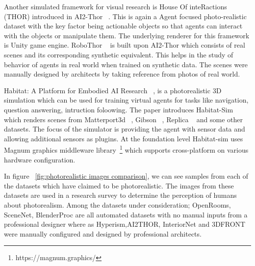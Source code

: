 Another simulated framework for visual research is House Of inteRactions (THOR) introduced in AI2-Thor ~\cite{kolve2019ai2thor}.
This is again a Agent focused photo-realistic dataset with the key factor being actionable objects so that agents can interact with the objects or manipulate them.
The underlying renderer for this framework is Unity game engine.
RoboThor ~\cite{Deitke2020RoboTHORAO} is built upon AI2-Thor which consists of real scenes and its corresponding synthetic equivalent.
This helps in the study of behavior of agents in real world when trained on synthetic data.
The scenes were manually designed by architects by taking reference from photos of real world.

Habitat: A Platform for Embodied AI Research ~\cite{savva2019habitat}, is a photorealistic 3D simulation which can be used for training virtual agents for tasks like navigation, question answering, intruction foloowing.
The paper introduces Habitat-Sim which renders scenes from Matterport3d ~\cite{chang2017matterport3d}, Gibson ~\cite{xia2018gibson}, Replica ~\cite{Straub2019TheRD} and some other datasets.
The focus of the simulator is providing the agent with sensor data and allowing additional sensors as plugins.
At the foundation level Habitat-sim uses Magnum graphics
middleware library~\footnote{https://magnum.graphics/} which supports cross-platform on various hardware configuration.

In figure ~\ref{fig:photorealistic images comparison}, we can see samples from each of the datasets which have claimed to be photorealistic.
The images from these datasets are used in a research survey to determine the perception of humans about photorealism.
Among the datasets under consideration; OpenRooms, SceneNet, BlenderProc are all automated datasets with no manual inputs from a professional designer where as
Hyperism,AI2THOR, InteriorNet and 3DFRONT were manually configured and designed by professional architects.


